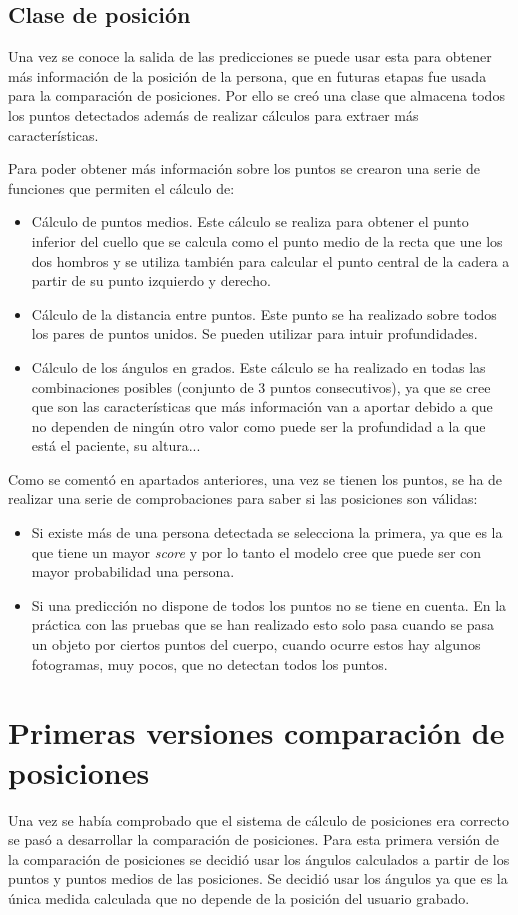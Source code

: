 \subsection{Clase de posición}
Una vez se conoce la salida de las predicciones se puede usar esta para obtener más información de la posición de la persona, que en futuras etapas fue usada para la comparación de posiciones. Por ello se creó una clase que almacena todos los puntos detectados además de realizar cálculos para extraer más características.

Para poder obtener más información sobre los puntos se crearon una serie de funciones que permiten el cálculo de:
\begin{itemize}
	\item Cálculo de puntos medios. Este cálculo se realiza para obtener el punto inferior del cuello que se calcula como el punto medio de la recta que une los dos hombros y se utiliza también para calcular el punto central de la cadera a partir de su punto izquierdo y derecho.
	\item Cálculo de la distancia entre puntos. Este punto se ha realizado sobre todos los pares de puntos unidos. Se pueden utilizar para intuir profundidades.
	\item Cálculo de los ángulos en grados. Este cálculo se ha realizado en todas las combinaciones posibles (conjunto de 3 puntos consecutivos), ya que se cree que son las características que más información van a aportar debido a que no dependen de ningún otro valor como puede ser la profundidad a la que está el paciente, su altura...
\end{itemize}

Como se comentó en apartados anteriores, una vez se tienen los puntos, se ha de realizar una serie de comprobaciones para saber si las posiciones son válidas:
\begin{itemize}
	\item Si existe más de una persona detectada se selecciona la primera, ya que es la que tiene un mayor \textit{score} y por lo tanto el modelo cree que puede ser con mayor probabilidad una persona.
	\item Si una predicción no dispone de todos los puntos no se tiene en cuenta. En la práctica con las pruebas que se han realizado esto solo pasa cuando se pasa un objeto por ciertos puntos del cuerpo, cuando ocurre estos hay algunos fotogramas, muy pocos, que no detectan todos los puntos.
\end{itemize}

\section{Primeras versiones comparación de posiciones} \label{PrimeraVersion}
Una vez se había comprobado que el sistema de cálculo de posiciones era correcto se pasó a desarrollar la comparación de posiciones. Para esta primera versión de la comparación de posiciones se decidió usar los ángulos calculados a partir de los puntos y puntos medios de las posiciones. Se decidió usar los ángulos ya que es la única medida calculada que no depende de la posición del usuario grabado.

